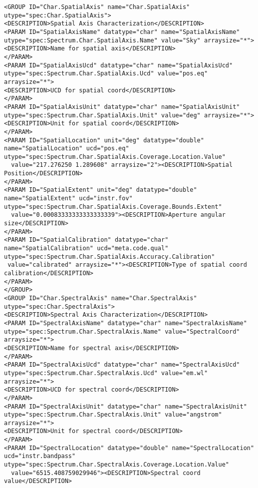 \begin{landscape}
{\begin{flushleft}
\begin{fmlpage}
\begin{verbatim}
<GROUP ID="Char.SpatialAxis" name="Char.SpatialAxis" utype="spec:Char.SpatialAxis">
<DESCRIPTION>Spatial Axis Characterization</DESCRIPTION>
<PARAM ID="SpatialAxisName" datatype="char" name="SpatialAxisName" utype="spec:Spectrum.Char.SpatialAxis.Name" value="Sky" arraysize="*">
<DESCRIPTION>Name for spatial axis</DESCRIPTION>
</PARAM>
<PARAM ID="SpatialAxisUcd" datatype="char" name="SpatialAxisUcd" utype="spec:Spectrum.Char.SpatialAxis.Ucd" value="pos.eq" arraysize="*">
<DESCRIPTION>UCD for spatial coord</DESCRIPTION>
</PARAM>
<PARAM ID="SpatialAxisUnit" datatype="char" name="SpatialAxisUnit" utype="spec:Spectrum.Char.SpatialAxis.Unit" value="deg" arraysize="*">
<DESCRIPTION>Unit for spatial coord</DESCRIPTION>
</PARAM>
<PARAM ID="SpatialLocation" unit="deg" datatype="double" name="SpatialLocation" ucd="pos.eq" utype="spec:Spectrum.Char.SpatialAxis.Coverage.Location.Value" 
  value="217.276250 1.289608" arraysize="2"><DESCRIPTION>Spatial Position</DESCRIPTION>
</PARAM>
<PARAM ID="SpatialExtent" unit="deg" datatype="double" name="SpatialExtent" ucd="instr.fov" utype="spec:Spectrum.Char.SpatialAxis.Coverage.Bounds.Extent"
  value="0.00083333333333333339"><DESCRIPTION>Aperture angular size</DESCRIPTION>
</PARAM>
<PARAM ID="SpatialCalibration" datatype="char" name="SpatialCalibration" ucd="meta.code.qual" utype="spec:Spectrum.Char.SpatialAxis.Accuracy.Calibration" 
 value="calibrated" arraysize="*"><DESCRIPTION>Type of spatial coord calibration</DESCRIPTION>
</PARAM>
</GROUP>
<GROUP ID="Char.SpectralAxis" name="Char.SpectralAxis" utype="spec:Char.SpectralAxis">
<DESCRIPTION>Spectral Axis Characterization</DESCRIPTION>
<PARAM ID="SpectralAxisName" datatype="char" name="SpectralAxisName" utype="spec:Spectrum.Char.SpectralAxis.Name" value="SpectralCoord" arraysize="*">
<DESCRIPTION>Name for spectral axis</DESCRIPTION>
</PARAM>
<PARAM ID="SpectralAxisUcd" datatype="char" name="SpectralAxisUcd" utype="spec:Spectrum.Char.SpectralAxis.Ucd" value="em.wl" arraysize="*">
<DESCRIPTION>UCD for spectral coord</DESCRIPTION>
</PARAM>
<PARAM ID="SpectralAxisUnit" datatype="char" name="SpectralAxisUnit" utype="spec:Spectrum.Char.SpectralAxis.Unit" value="angstrom" arraysize="*">
<DESCRIPTION>Unit for spectral coord</DESCRIPTION>
</PARAM>
<PARAM ID="SpectralLocation" datatype="double" name="SpectralLocation" ucd="instr.bandpass" utype="spec:Spectrum.Char.SpectralAxis.Coverage.Location.Value" 
  value="6515.408759029946"><DESCRIPTION>Spectral coord value</DESCRIPTION>

\end{verbatim}
\end{fmlpage}
\end{flushleft}}
\end{landscape}
